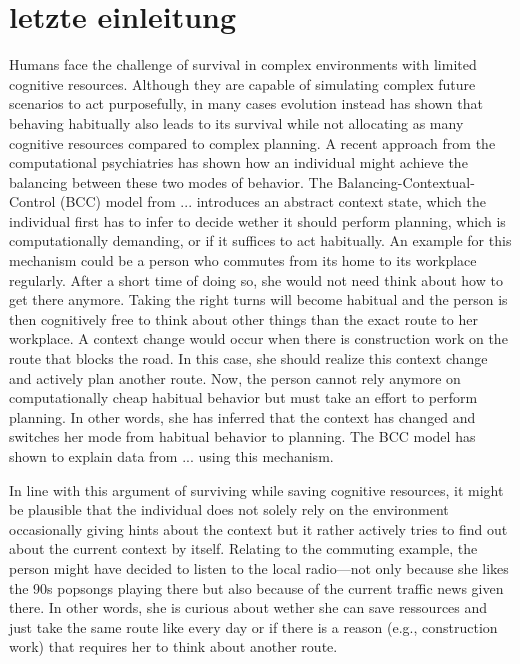 \chapter{letzte einleitung}

Humans face the challenge of survival in complex environments with limited cognitive resources. Although they are capable of simulating complex future scenarios to act purposefully, in many cases evolution instead has shown that behaving habitually also leads to its survival while not allocating as many cognitive resources compared to complex planning. A recent approach from the computational psychiatries has shown how an individual might achieve the balancing between these two modes of behavior. The Balancing-Contextual-Control (BCC) model from ... introduces an abstract context state, which the individual first has to infer to decide wether it should perform planning, which is computationally demanding, or if it suffices to act habitually. An example for this mechanism could be a person who commutes from its home to its workplace regularly. After a short time of doing so, she would not need think about how to get there anymore. Taking the right turns will become habitual and the person is then cognitively free to think about other things than the exact route to her workplace. A context change would occur when there is construction work on the route that blocks the road. In this case, she should realize this context change and actively plan another route. Now, the person cannot rely anymore on computationally cheap habitual behavior but must take an effort to perform planning. In other words, she has inferred that the context has changed and switches her mode from habitual behavior to planning. The BCC model has shown to explain data from ... using this mechanism.

In line with this argument of surviving while saving cognitive resources, it might be plausible that the individual does not solely rely on the environment occasionally giving hints about the context but it rather actively tries to find out about the current context by itself. Relating to the commuting example, the person might have decided to listen to the local radio---not only because she likes the 90s popsongs playing there but also because of the current traffic news given there. In other words, she is curious about wether she can save ressources and just take the same route like every day or if there is a reason (e.g., construction work) that requires her to think about another route.

